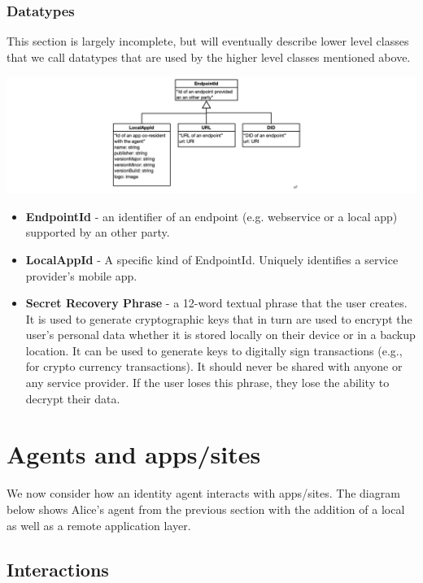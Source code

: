 \documentclass[11pt, oneside]{article}   	%
\begin{document}
\subsubsection{Datatypes}

This section is largely incomplete, but will eventually describe lower level classes that we call datatypes that are used by the higher level classes mentioned above.

\includegraphics[width=\textwidth]{./images/datatypes.png}

\begin{itemize}
\item \textbf{EndpointId} -  an identifier of an endpoint (e.g. webservice or a local app) supported by an other party.
\item \textbf{LocalAppId} - A specific kind of EndpointId. Uniquely identifies a service provider's mobile app. 
\item \textbf{Secret Recovery Phrase} - a 12-word textual phrase that the user creates. It is used to generate cryptographic keys that in turn are used to encrypt the user’s personal data whether it is stored locally on their device or in a backup location. It can be used to generate keys to digitally sign transactions (e.g., for crypto currency transactions). It should never be shared with anyone or any service provider. If the user loses this phrase, they lose the ability to decrypt their data. 
\end{itemize}

\section{Agents and apps/sites} %

We now consider how an identity agent interacts with apps/sites. The diagram below shows Alice's agent from the previous section with the addition of a local as well as a remote application layer. 

\subsection{Interactions}
\end{document}
